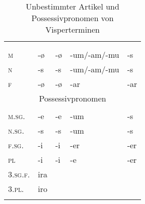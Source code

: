 
\begin{table}[H]
	\caption{Unbestimmter Artikel und Possessivpronomen von Visperterminen \citep[137, 144]{Wipf1911}}\label{table105}
	\begin{tabular}{lllll}
		\lsptoprule
		\multicolumn{5}{c}{unbestimmter Artikel} \\
		& \NOM & \AKK & \DAT & \GEN\\\midrule
		\textsc{m} & {}-ø & {}-ø & \mbox{{}-um/-am/-mu} & {}-s\\
		\textsc{n} & {}-s & {}-s & \mbox{{}-um/-am/-mu} & {}-s\\
		\textsc{f} & {}-ø & {}-ø & {}-ar & {}-ar\\\midrule
		\multicolumn{5}{c}{Possessivpronomen} \\
		& \NOM & \AKK & \DAT & \GEN\\\midrule
		\textsc{m.sg.} & {}-e & {}-e & {}-um & {}-s\\
		\textsc{n.sg.} & {}-s & {}-s & {}-um & {}-s\\
		\textsc{f.sg.} & {}-i & {}-i & {}-er & {}-er\\
		\textsc{pl} & {}-i & {}-i & {}-e & {}-er\\
		\midrule
		\textsc{3.sg.f.} & ira &  &  & \\
		\textsc{3.pl.} & iro &  &  & \\
		\lspbottomrule
	\end{tabular}
\end{table}


